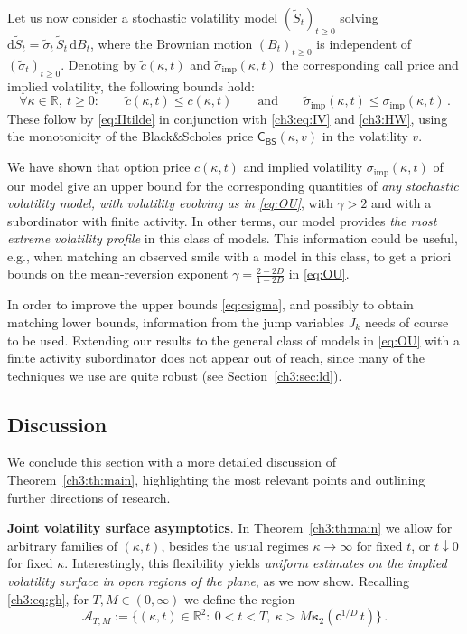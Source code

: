 \documentclass[a4paper,reqno,11pt]{amsart}
\numberwithin{equation}{section}
\newcommand{\cA}{{\ensuremath{\mathcal A}} }
\renewcommand{\tilde}{\widetilde}          %
\newcommand{\dd}{\text{\rm d}}             %
\newcommand{\R}{\mathbb{R}}
\newcommand\sfc{\mathsf{c}}
\def\dd{\mathrm{d}}
\newcommand\CBS{\mathsf{C_{BS}}}
\newcommand\imp{\mathrm{imp}}
\newcommand\bkappa{\boldsymbol{\kappa}}
\begin{document}
Let us now consider a stochastic volatility model $(\tilde S_t)_{t\ge 0}$
solving $\dd \tilde S_t = \tilde \sigma_t \, \tilde S_t \, \dd B_t$, where
the Brownian motion $(B_t)_{t\ge 0}$ is independent of $(\tilde \sigma_t)_{t\ge 0}$.
Denoting by $\tilde c(\kappa,t)$ and $\tilde\sigma_\imp(\kappa,t)$
the corresponding call price and implied volatility,
the following bounds hold:
\begin{equation}\label{eq:csigma}
	\forall \kappa \in \R, \ t \ge 0: \qquad
	\tilde c(\kappa,t) \le c(\kappa,t) \qquad \text{and} \qquad
	\tilde \sigma_\imp(\kappa,t) \le \sigma_\imp(\kappa,t) \,.
\end{equation}
These follow by \eqref{eq:IItilde} in conjunction with 
\eqref{ch3:eq:IV} and \eqref{ch3:HW},
using the monotonicity of the Black\&Scholes price $\CBS(\kappa,v)$ in the volatility $v$.

\smallskip

We have shown that option price $c(\kappa,t)$
and implied volatility $\sigma_\imp(\kappa,t)$ of our
model give an upper bound for the corresponding quantities of 
\emph{any stochastic volatility model,
with volatility evolving as in
\eqref{eq:OU}}, with $\gamma > 2$ and with a subordinator with finite activity.
In other terms, our model provides \emph{the most extreme volatility profile} in 
this class of models. 
This information could be useful, e.g.,
when matching an observed smile with
a model in this class,
to get a priori bounds on the mean-reversion exponent $\gamma = \frac{2-2D}{1-2D}$
in \eqref{eq:OU}.

In order to improve the upper bounds \eqref{eq:csigma}, 
and possibly to obtain matching lower bounds,
information from the jump variables $J_k$ needs of course to be used.
Extending our results to the general class of models in \eqref{eq:OU}
with a finite activity subordinator
does not appear out of reach, since many of the techniques
we use are quite robust (see Section~\ref{ch3:sec:ld}).

\subsection{Discussion}
\label{ch3:sec:discussion}

We conclude this section with a more detailed discussion of
Theorem~\ref{ch3:th:main}, highlighting the most
relevant points and outlining further directions of research.

\medskip
\noindent
\textbf{Joint volatility surface asymptotics}.
In Theorem~\ref{ch3:th:main}
we allow for arbitrary families of $(\kappa,t)$, besides the usual regimes
$\kappa \to \infty$ for fixed $t$, or $t \downarrow 0$ for fixed $\kappa$.
Interestingly, this flexibility
yields \emph{uniform estimates on the implied volatility surface in open regions of the plane},
as we now show. Recalling \eqref{ch3:eq:gh},
for $T, M \in (0,\infty)$ we define the region
\begin{equation*}
	\cA_{T,M} := \bigg\{(\kappa,t) \in \R^2: \ 0 < t < T, \ \kappa > 
	M \bkappa_2(\sfc^{1/D} \, t) \bigg\} \,.
\end{equation*}
\end{document}
